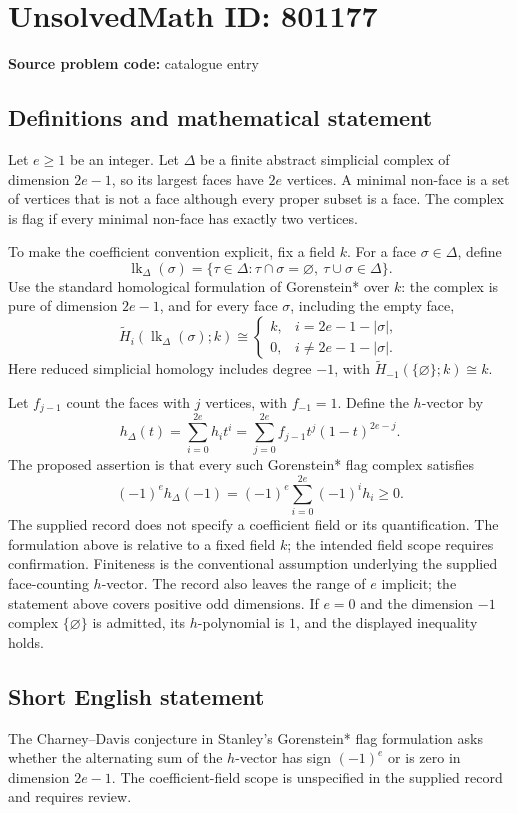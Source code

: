 \documentclass[11pt]{article}
\begin{document}
\section*{UnsolvedMath ID: 801177}
\textbf{Source problem code:} catalogue entry
\subsection{Definitions and mathematical statement}
Let \(e\geq 1\) be an integer. Let \(\Delta\) be a finite abstract simplicial complex of dimension \(2e-1\), so its largest faces have \(2e\) vertices. A minimal non-face is a set of vertices that is not a face although every proper subset is a face. The complex is flag if every minimal non-face has exactly two vertices.

To make the coefficient convention explicit, fix a field \(k\). For a face \(\sigma\in\Delta\), define
\[
\operatorname{lk}_{\Delta}(\sigma)=\{\tau\in\Delta:\tau\cap\sigma=\varnothing,\ \tau\cup\sigma\in\Delta\}.
\]
Use the standard homological formulation of Gorenstein* over \(k\): the complex is pure of dimension \(2e-1\), and for every face \(\sigma\), including the empty face,
\[
\widetilde H_i(\operatorname{lk}_{\Delta}(\sigma);k)\cong
\begin{cases}
k,&i=2e-1-|\sigma|,\\
0,&i\neq 2e-1-|\sigma|.
\end{cases}
\]
Here reduced simplicial homology includes degree \(-1\), with \(\widetilde H_{-1}(\{\varnothing\};k)\cong k\).

Let \(f_{j-1}\) count the faces with \(j\) vertices, with \(f_{-1}=1\). Define the \(h\)-vector by
\[
h_{\Delta}(t)=\sum_{i=0}^{2e}h_i t^i
=\sum_{j=0}^{2e}f_{j-1}t^j(1-t)^{2e-j}.
\]
The proposed assertion is that every such Gorenstein* flag complex satisfies
\[
(-1)^e h_{\Delta}(-1)
=(-1)^e\sum_{i=0}^{2e}(-1)^i h_i\geq 0.
\]
The supplied record does not specify a coefficient field or its quantification. The formulation above is relative to a fixed field \(k\); the intended field scope requires confirmation. Finiteness is the conventional assumption underlying the supplied face-counting \(h\)-vector. The record also leaves the range of \(e\) implicit; the statement above covers positive odd dimensions. If \(e=0\) and the dimension \(-1\) complex \(\{\varnothing\}\) is admitted, its \(h\)-polynomial is \(1\), and the displayed inequality holds.
\subsection{Short English statement}
The Charney--Davis conjecture in Stanley's Gorenstein* flag formulation asks whether the alternating sum of the \(h\)-vector has sign \((-1)^e\) or is zero in dimension \(2e-1\). The coefficient-field scope is unspecified in the supplied record and requires review.
\end{document}
